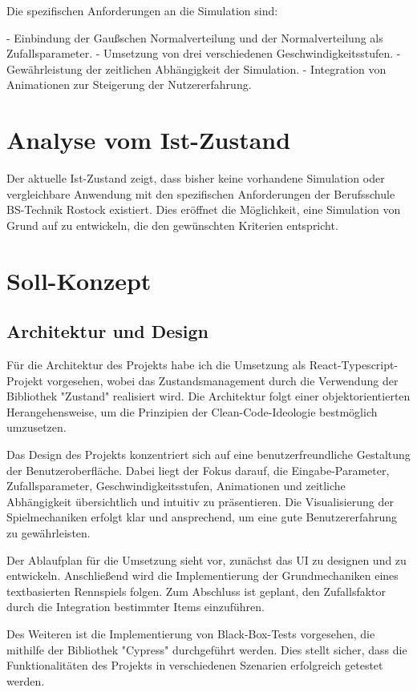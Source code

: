 \documentclass[hidelinks,12pt]{article}
\begin{document}
Die spezifischen Anforderungen an die Simulation sind:

- Einbindung der Gaußschen Normalverteilung und der Normalverteilung als Zufallsparameter.
- Umsetzung von drei verschiedenen Geschwindigkeitsstufen.
- Gewährleistung der zeitlichen Abhängigkeit der Simulation.
- Integration von Animationen zur Steigerung der Nutzererfahrung.

\section{Analyse vom Ist-Zustand}
Der aktuelle Ist-Zustand zeigt, dass bisher keine vorhandene Simulation oder vergleichbare Anwendung mit den spezifischen Anforderungen der Berufsschule BS-Technik Rostock existiert. Dies eröffnet die Möglichkeit, eine Simulation von Grund auf zu entwickeln, die den gewünschten Kriterien entspricht.

\section{Soll-Konzept}

\subsection{Architektur und Design}
Für die Architektur des Projekts habe ich die Umsetzung als React-Typescript-Projekt vorgesehen, wobei das Zustandsmanagement durch die Verwendung der Bibliothek "Zustand" realisiert wird. Die Architektur folgt einer objektorientierten Herangehensweise, um die Prinzipien der Clean-Code-Ideologie bestmöglich umzusetzen.

Das Design des Projekts konzentriert sich auf eine benutzerfreundliche Gestaltung der Benutzeroberfläche. Dabei liegt der Fokus darauf, die Eingabe-Parameter, Zufallsparameter, Geschwindigkeitsstufen, Animationen und zeitliche Abhängigkeit übersichtlich und intuitiv zu präsentieren. Die Visualisierung der Spielmechaniken erfolgt klar und ansprechend, um eine gute Benutzererfahrung zu gewährleisten.

Der Ablaufplan für die Umsetzung sieht vor, zunächst das UI zu designen und zu entwickeln. Anschließend wird die Implementierung der Grundmechaniken eines textbasierten Rennspiels folgen. Zum Abschluss ist geplant, den Zufallsfaktor durch die Integration bestimmter Items einzuführen.

Des Weiteren ist die Implementierung von Black-Box-Tests vorgesehen, die mithilfe der Bibliothek "Cypress" durchgeführt werden. Dies stellt sicher, dass die Funktionalitäten des Projekts in verschiedenen Szenarien erfolgreich getestet werden.
\end{document}

